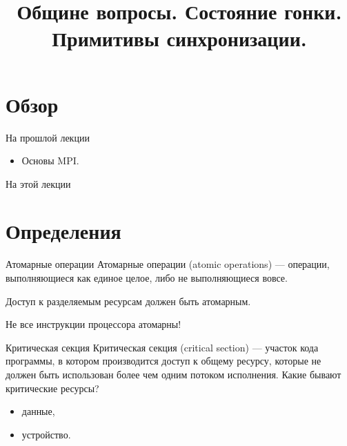 

\title{Общине вопросы. Состояние гонки. Примитивы синхронизации.}



\begin{frame}
\titlepage
\end{frame}

\section*{Обзор}
\begin{frame}{На прошлой лекции}

\begin{itemize}
    \item Основы MPI.
\end{itemize}
\end{frame}

\begin{frame}{На этой лекции}
\tableofcontents
\end{frame}

\section{Определения}

\begin{frame}{Атомарные операции}
Атомарные операции (\abbr atomic operations) --- операции, выполняющиеся как
единое целое, либо не выполняющиеся вовсе.
\vspace*{0.5cm}

Доступ к разделяемым ресурсам должен быть атомарным.
\vspace*{0.5cm}

Не все инструкции процессора атомарны!
\end{frame}

\begin{frame}{Критическая секция}
Критическая секция (\abbr critical section) --- участок кода программы, в
котором производится доступ к общему ресурсу, которые не должен быть использован
более чем одним потоком исполнения.
\vfill\pause
Какие бывают критические ресурсы?
\pause
\begin{itemize}
    \item данные,
    \pause
    \item устройство.
\end{itemize}
\end{frame}

